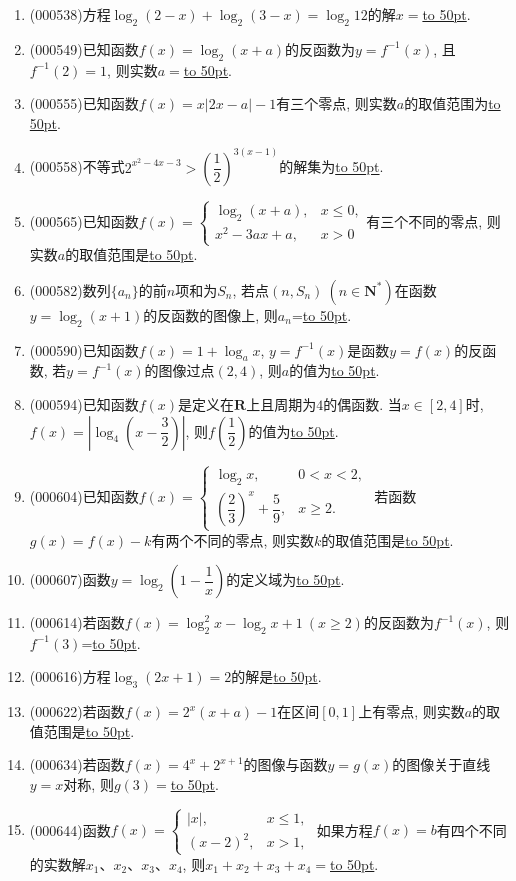\documentclass[10pt,a4paper]{article}
\newcommand{\blank}[1]{\underline{\hbox to #1pt{}}}
\begin{document}
\begin{enumerate}[1.]
\item {\tiny (000538)}方程$\log_2(2-x)+\log_2(3-x)=\log_2 12$的解$x=$\blank{50}.
\item {\tiny (000549)}已知函数$f(x)=\log_2(x+a)$的反函数为$y=f^{-1}(x)$, 且$f^{-1}(2)=1$, 则实数$a=$\blank{50}.
\item {\tiny (000555)}已知函数$f(x)=x|2x-a|-1$有三个零点, 则实数$a$的取值范围为\blank{50}.
\item {\tiny (000558)}不等式$2^{x^2-4x-3}>(\dfrac12 )^{3(x-1)}$的解集为\blank{50}.
\item {\tiny (000565)}已知函数$f(x)=\begin{cases} \log_2 (x+a), & x\le 0, \\ x^2-3ax+a, & x>0 \end{cases}$有三个不同的零点, 则实数$a$的取值范围是\blank{50}.
\item {\tiny (000582)}数列$\{a_n\}$的前$n$项和为$S_n$, 若点$(n,S_n) \ (n\in \mathbf{N}^*)$在函数$y=\log_2 (x+1)$的反函数的图像上, 则$a_n$=\blank{50}.
\item {\tiny (000590)}已知函数$f(x)=1+\log_a x$, $y=f^{-1}(x)$是函数$y=f(x)$的反函数, 若$y=f^{-1}(x)$的图像过点$(2,4)$, 则$a$的值为\blank{50}.
\item {\tiny (000594)}已知函数$f(x)$是定义在$\mathbf{R}$上且周期为$4$的偶函数. 当$x\in [2,4]$时, $f(x)=\left|\log_4(x-\dfrac32)\right|$, 则$f(\dfrac12)$的值为\blank{50}.
\item {\tiny (000604)}已知函数$f(x)=\begin{cases} \log_2 x, & 0<x<2, \\ (\dfrac23)^x+\dfrac59, & x\ge 2. \end{cases}$ 若函数$g(x)=f(x)-k$有两个不同的零点, 则实数$k$的取值范围是\blank{50}.
\item {\tiny (000607)}函数$y=\log_2(1-\dfrac1x)$的定义域为\blank{50}.
\item {\tiny (000614)}若函数$f(x)=\log_2^2x-\log_2 x+1 \ (x\ge 2)$的反函数为$f^{-1}(x)$, 则$f^{-1}(3)$=\blank{50}.
\item {\tiny (000616)}方程$\log_3(2x+1)=2$的解是\blank{50}.
\item {\tiny (000622)}若函数$f(x)=2^x(x+a)-1$在区间$[0,1]$上有零点, 则实数$a$的取值范围是\blank{50}.
\item {\tiny (000634)}若函数$f(x)=4^x+2^{x+1}$的图像与函数$y=g(x)$的图像关于直线$y=x$对称, 则$g(3)=$\blank{50}.
\item {\tiny (000644)}函数$f(x)=\begin{cases} |x|, & x\le 1,  \\ (x-2)^2, & x>1, \end{cases}$ 如果方程$f(x)=b$有四个不同的实数解$x_1$、$x_2$、$x_3$、$x_4$, 则${x_1}+{x_2}+{x_3}+{x_4}=$\blank{50}.

\end{enumerate}
\end{document}
